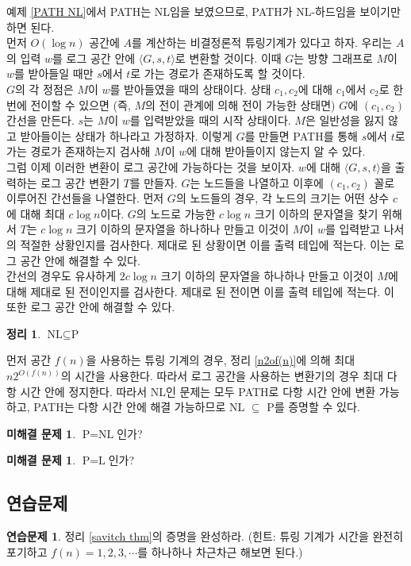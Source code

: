 \documentclass[a4paper, 11pt]{article}
\theoremstyle{definition}
\newtheorem{thm}[defn]{정리}
\newtheorem{ec}{연습문제}[section]
\newtheorem{oq}[defn]{미해결 문제}
\newenvironment{pf*}{\pushQED{\qed}\pf}
{\popQED\endpf}
\begin{document}
\begin{pf*}
    예제 \ref{PATH NL}에서 PATH는 NL임을 보였으므로, PATH가 NL-하드임을 보이기만 하면 된다. \\
    먼저 $O(\log n)$ 공간에 $A$를 계산하는 비결정론적 튜링기계가 있다고 하자. 우리는 $A$의 입력 $w$를 로그 공간 안에 $\langle G, s, t \rangle$로 변환할 것이다. 이때 $G$는 방향 그래프로 $M$이 $w$를 받아들일 때만 $s$에서 $t$로 가는 경로가 존재하도록 할 것이다. \\
    $G$의 각 정점은 $M$이 $w$를 받아들였을 때의 상태이다. 상태 $c_1, c_2$에 대해 $c_1$에서 $c_2$로 한 번에 전이할 수 있으면 (즉, $M$의 전이 관계에 의해 전이 가능한 상태면) $G$에 $(c_1, c_2)$ 간선을 만든다. $s$는 $M$이 $w$를 입력받았을 때의 시작 상태이다. $M$은 일반성을 잃지 않고 받아들이는 상태가 하나라고 가정하자. 이렇게 $G$를 만들면 PATH를 통해 $s$에서 $t$로 가는 경로가 존재하는지 검사해 $M$이 $w$에 대해 받아들이지 않는지 알 수 있다. \\
    그럼 이제 이러한 변환이 로그 공간에 가능하다는 것을 보이자. $w$에 대해 $\langle G, s, t \rangle$을 출력하는 로그 공간 변환기 $T$를 만들자. $G$는 노드들을 나열하고 이후에 $(c_1, c_2)$ 꼴로 이루어진 간선들을 나열한다. 먼저 $G$의 노드들의 경우, 각 노드의 크기는 어떤 상수 $c$에 대해 최대 $c\log n$이다. $G$의 노드로 가능한 $c \log n$ 크기 이하의 문자열을 찾기 위해서 $T$는 $c \log n$ 크기 이하의 문자열을 하나하나 만들고 이것이 $M$이 $w$를 입력받고 나서의 적절한 상황인지를 검사한다. 제대로 된 상황이면 이를 출력 테입에 적는다. 이는 로그 공간 안에 해결할 수 있다.\\
    간선의 경우도 유사하게 $2 c \log n $ 크기 이하의 문자열을 하나하나 만들고 이것이 $M$에 대해 제대로 된 전이인지를 검사한다. 제대로 된 전이면 이를 출력 테입에 적는다. 이 또한 로그 공간 안에 해결할 수 있다.
\end{pf*}
\begin{thm}
    $\text{NL} \subseteq \text{P}$
\end{thm}
\begin{pf*}
    먼저 공간 $f(n)$을 사용하는 튜링 기계의 경우, 정리 \ref{n2of(n)}에 의해 최대 $n2^{O(f(n))}$의 시간을 사용한다. 따라서 로그 공간을 사용하는 변환기의 경우 최대 다항 시간 안에 정지한다. 따라서 NL인 문제는 모두 PATH로 다항 시간 안에 변환 가능하고, PATH는 다항 시간 안에 해결 가능하므로 NL $\subseteq$ P를 증명할 수 있다.
\end{pf*}
\begin{oq}
    $\text{P} = \text{NL}$인가?
\end{oq}
\begin{oq}
    $\text{P} = \text{L}$인가?
\end{oq}
\subsection{연습문제}
\begin{ec}\label{savitch thm exec}
    정리 \ref{savitch thm}의 증명을 완성하라. (힌트: 튜링 기계가 시간을 완전히 포기하고 $f(n) = 1, 2, 3, \cdots$를 하나하나 차근차근 해보면 된다.)
\end{ec}
\end{document}

